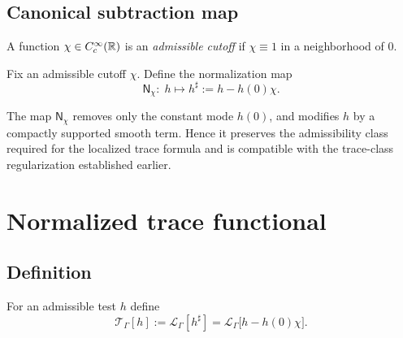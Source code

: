 \subsection{Canonical subtraction map}\label{subsec:08.zero-mode}

\begin{definition}\label{def:08.adm-cutoff}
A function $\chi\in C_c^\infty(\mathbb{R})$ is an \emph{admissible cutoff} if $\chi\equiv 1$ in a neighborhood of $0$.
\end{definition}

\begin{definition}\label{def:08.norm-map}
Fix an admissible cutoff $\chi$. Define the normalization map
\begin{equation}\label{eq:08.N.map}
\mathsf N_\chi:\; h\longmapsto h^\sharp:=h-h(0)\chi.
\end{equation}
\end{definition}

\begin{remark}\label{rem:08.norm-minimal}
The map $\mathsf N_\chi$ removes only the constant mode $h(0)$, and modifies $h$ by a compactly supported smooth term.
Hence it preserves the admissibility class required for the localized trace formula and is compatible with the trace-class
regularization established earlier.
\end{remark}

\section{Normalized trace functional}\label{sec:08.normalized-trace}

\subsection{Definition}\label{subsec:08.def-first}

\begin{definition}\label{def:08.norm-trace}
For an admissible test $h$ define
\begin{equation}\label{eq:08.T.def}
\mathcal T_\Gamma[h]
:=\mathcal L_\Gamma[h^\sharp]
=\mathcal L_\Gamma\!\big[h-h(0)\chi\big].
\end{equation}
\end{definition}

